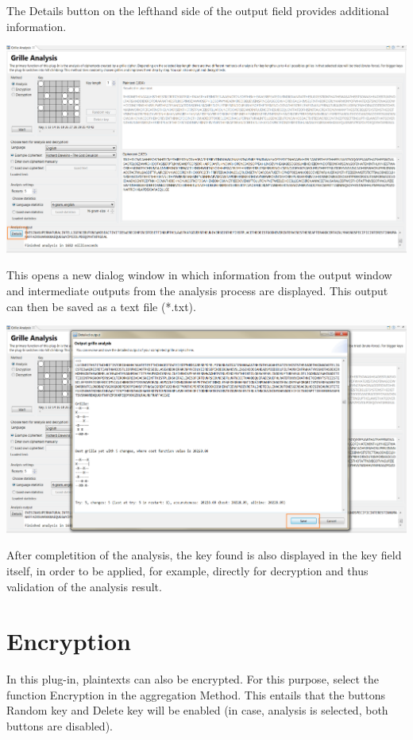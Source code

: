 \documentclass[fontsize=12pt, DIV=15, parskip=half-]{scrartcl}
\theoremstyle{break}
\begin{document}
The \glqq Details\grqq{} button on the lefthand side of the output field provides additional information.

\includegraphics[scale=0.45]{enFleissnerAusgabeAnalyseDetailButton.png}

This opens a new dialog window in which information from the output window and intermediate outputs from the analysis process are displayed. This output can then be saved as a text file (*.txt).

\includegraphics[scale=0.45]{enFleissnerAusgabeAnalyseGross.png}

After completition of the analysis, the key found is also displayed in the key field itself, in order to be applied, for example, directly for decryption and thus validation of the analysis result.
\newpage

\section{Encryption}\hypertarget{verschl}{}
In this plug-in, plaintexts can also be encrypted. For this purpose, select the function \glqq Encryption\grqq{} in the aggregation \glqq Method\grqq{}. This entails that the buttons \glqq Random key\grqq{} and \glqq Delete key\grqq{} will be enabled (in case, analysis is selected, both buttons are disabled).
\end{document}
